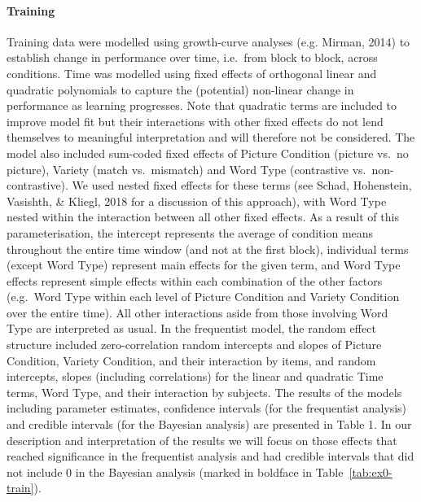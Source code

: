 \documentclass[doc,floatsintext]{apa6}
\let\oldparagraph\paragraph
\renewcommand{\paragraph}[1]{\oldparagraph{#1}\mbox{}}
\begin{document}
\paragraph{Training}\label{training}

Training data were modelled using growth-curve analyses (e.g. Mirman,
2014) to establish change in performance over time, i.e.~from block to
block, across conditions. Time was modelled using fixed effects of
orthogonal linear and quadratic polynomials to capture the (potential)
non-linear change in performance as learning progresses. Note that
quadratic terms are included to improve model fit but their interactions
with other fixed effects do not lend themselves to meaningful
interpretation and will therefore not be considered. The model also
included sum-coded fixed effects of Picture Condition (picture vs.~no
picture), Variety (match vs.~mismatch) and Word Type (contrastive
vs.~non-contrastive). We used nested fixed effects for these terms (see
Schad, Hohenstein, Vasishth, \& Kliegl, 2018 for a discussion of this
approach), with Word Type nested within the interaction between all
other fixed effects. As a result of this parameterisation, the intercept
represents the average of condition means throughout the entire time
window (and not at the first block), individual terms (except Word Type)
represent main effects for the given term, and Word Type effects
represent simple effects within each combination of the other factors
(e.g.~Word Type within each level of Picture Condition and Variety
Condition over the entire time). All other interactions aside from those
involving Word Type are interpreted as usual. In the frequentist model,
the random effect structure included zero-correlation random intercepts
and slopes of Picture Condition, Variety Condition, and their
interaction by items, and random intercepts, slopes (including
correlations) for the linear and quadratic Time terms, Word Type, and
their interaction by subjects. The results of the models including
parameter estimates, confidence intervals (for the frequentist analysis)
and credible intervals (for the Bayesian analysis) are presented in
Table 1. In our description and interpretation of the results we will
focus on those effects that reached significance in the frequentist
analysis and had credible intervals that did not include 0 in the
Bayesian analysis (marked in boldface in Table~\ref{tab:ex0-train}).
\end{document}
